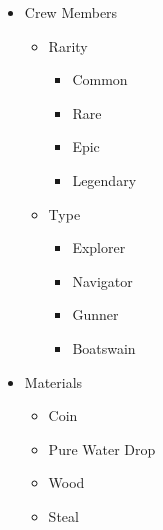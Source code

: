 \documentclass{article}
\begin{document}
\begin{itemize}
    \begin{itemize}
        \item Common
        \begin{itemize}
            \item Rusty Sword
            \item Iron Blade
        \end{itemize}
        \item Rare
        \begin{itemize}
            \item Cinder Blade
            \item Water Edge
        \end{itemize}
        \item Epic
        \begin{itemize}
            \item Dragon Claw
            \item Vortex Blade
            \item Shadow Sword
            \item Emberstrike
        \end{itemize}
        \item Legendary
        \begin{itemize}
            \item Excalibur
            \item Eclipse
        \end{itemize}
    \end{itemize}
    \item Crew Members
    \begin{itemize}
        \item Rarity
        \begin{itemize}
            \item Common
            \item Rare
            \item Epic
            \item Legendary
        \end{itemize}
        \item Type
        \begin{itemize}
            \item Explorer
            \item Navigator
            \item Gunner
            \item Boatswain
        \end{itemize}
    \end{itemize}
    \item Materials
    \begin{itemize}
        \item Coin
        \item Pure Water Drop
        \item Wood
        \item Steal
    \end{itemize}
\end{itemize}
\end{document}
